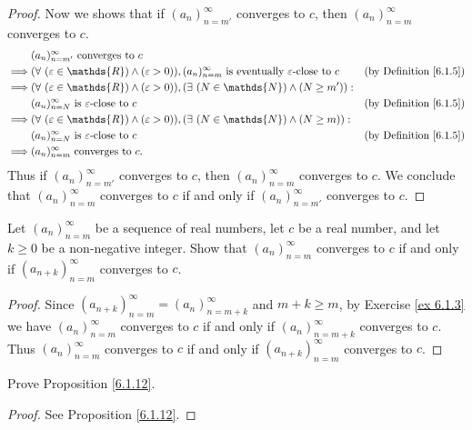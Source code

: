 \begin{proof}
Now we shows that if \((a_n)_{n = m'}^\infty\) converges to \(c\), then \((a_n)_{n = m}^\infty\) converges to \(c\).
\begin{align*}
& (a_n)_{n = m'}^\infty \text{ converges to } c \\
\implies & (\forall\ (\varepsilon \in \mathds{R}) \land (\varepsilon > 0)), (a_n)_{n = m}^\infty \text{ is eventually } \varepsilon\text{-close to } c & \text{(by Definition \ref{6.1.5})} \\
\implies & (\forall\ (\varepsilon \in \mathds{R}) \land (\varepsilon > 0)), (\exists\ (N \in \mathds{N}) \land (N \geq m')) : \\
& (a_n)_{n = N}^\infty \text{ is } \varepsilon\text{-close to } c & \text{(by Definition \ref{6.1.5})} \\
\implies & (\forall\ (\varepsilon \in \mathds{R}) \land (\varepsilon > 0)), (\exists\ (N \in \mathds{N}) \land (N \geq m)) : \\
& (a_n)_{n = N}^\infty \text{ is } \varepsilon\text{-close to } c & \text{(by Definition \ref{6.1.5})} \\
\implies & (a_n)_{n = m}^\infty \text{ converges to } c.
\end{align*}
Thus if \((a_n)_{n = m'}^\infty\) converges to \(c\), then \((a_n)_{n = m}^\infty\) converges to \(c\).
We conclude that \((a_n)_{n = m}^\infty\) converges to \(c\) if and only if \((a_n)_{n = m'}^\infty\) converges to \(c\).
\end{proof}

\begin{exercise}\label{ex 6.1.4}
Let \((a_n)_{n = m}^\infty\) be a sequence of real numbers, let \(c\) be a real number, and let \(k \geq 0\) be a non-negative integer.
Show that \((a_n)_{n = m}^\infty\) converges to \(c\) if and only if \((a_{n + k})_{n = m}^\infty\) converges to \(c\).
\end{exercise}

\begin{proof}
Since \((a_{n + k})_{n = m}^\infty = (a_n)_{n = m + k}^\infty\) and \(m + k \geq m\), by Exercise \ref{ex 6.1.3} we have \((a_n)_{n = m}^\infty\) converges to \(c\) if and only if \((a_n)_{n = m + k}^\infty\) converges to \(c\).
Thus \((a_n)_{n = m}^\infty\) converges to \(c\) if and only if \((a_{n + k})_{n = m}^\infty\) converges to \(c\).
\end{proof}

\begin{exercise}\label{ex 6.1.5}
Prove Proposition \ref{6.1.12}.
\end{exercise}

\begin{proof}
See Proposition \ref{6.1.12}.
\end{proof}